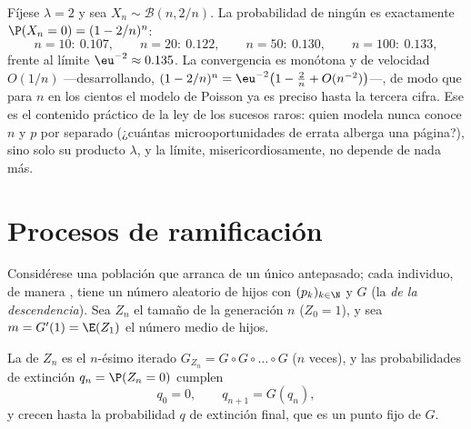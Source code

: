 \begin{example}\label{ex:b2:genfun:poissonnumerics}
Fíjese $\lambda = 2$ y sea $X_n \sim \mathcal B(n, 2/n)$. La
probabilidad de ningún  es exactamente $\P(X_n = 0) = (1 -
2/n)^n$:
\[
n = 10:\ 0.107, \qquad
n = 20:\ 0.122, \qquad
n = 50:\ 0.130, \qquad
n = 100:\ 0.133,
\]
frente al límite $\eu^{-2} \approx 0.135$. La convergencia es
monótona y de velocidad $O(1/n)$ ---desarrollando, $(1 - 2/n)^n =
\eu^{-2}\bigl(1 - \tfrac2n + O(n^{-2})\bigr)$---, de modo que para
$n$ en los cientos el modelo de Poisson ya es preciso hasta la
tercera cifra. Ese es el contenido práctico de la ley de los sucesos
raros: quien modela nunca conoce $n$ y $p$ por separado (¿cuántas
microoportunidades de errata alberga una página?), sino solo su
producto $\lambda$, y la  límite, misericordiosamente, no depende
de nada más.
\end{example}

\section{Procesos de ramificación}

Considérese una población que arranca de un único antepasado; cada
individuo, de manera , tiene un número aleatorio de hijos
con  $(p_k)_{k \in \N}$ y  $G$ (la
\emph{ de la descendencia}). Sea $Z_n$ el tamaño de la
generación $n$ ($Z_0 = 1$), y sea $m = G'(1) = \E(Z_1)$ el número
medio de hijos.

\begin{proposition}\label{prop:b2:genfun:branching}
La  de $Z_n$ es el $n$-ésimo iterado $G_{Z_n} = G
\circ G \circ \dots \circ G$ ($n$ veces), y las probabilidades de
extinción $q_n = \P(Z_n = 0)$ cumplen
\[
q_0 = 0, \qquad q_{n+1} = G(q_n),
\]
y crecen hasta la probabilidad $q$ de extinción final, que es un
punto fijo de $G$.
\end{proposition}

